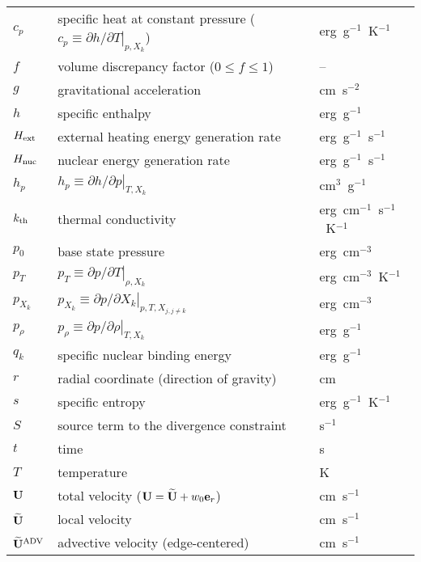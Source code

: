 \begin{center}
\begin{longtable}{|l|p{4.0in}|l|}
$c_p$   & specific heat at constant pressure
          ($c_p \equiv \left . \partial h / \partial T \right |_{p,X_k}$)
        & erg~g$^{-1}$~K$^{-1}$ \\
$f$     & volume discrepancy factor ($0 \le f \le 1$) & -- \\
$g$     & gravitational acceleration                 & cm~s$^{-2}$ \\
$h$     & specific enthalpy                          & erg~g$^{-1}$ \\
${H_{\rm ext}}$ & external heating energy generation rate    & erg~g$^{-1}$~s$^{-1}$ \\
${H_{\rm nuc}}$ & nuclear energy generation rate             & erg~g$^{-1}$~s$^{-1}$ \\
$h_p$   & $h_p \equiv \left . \partial h / \partial p \right |_{T,X_k}$ & cm$^{3}$~g$^{-1}$ \\
$k_{\rm th}$  & thermal conductivity                       & erg~cm$^{-1}$~s$^{-1}$~K$^{-1}$ \\
$p_0$   & base state pressure                        & erg~cm$^{-3}$ \\
$p_T$   & $p_T \equiv \left . \partial p / \partial T \right |_{\rho,X_k}$ & erg~cm$^{-3}$~K$^{-1}$ \\
$p_{X_k}$ & $p_{X_k} \equiv \left . \partial p / \partial X_k \right |_{p,T,X_{j,j\ne k}}$ & erg~cm$^{-3}$ \\
$p_\rho$ & $p_\rho \equiv \left . \partial p / \partial \rho \right |_{T,X_k}$ & erg~g$^{-1}$ \\
$q_k$   & specific nuclear binding energy            & erg~g$^{-1}$  \\
$r$     & radial coordinate (direction of gravity)   & cm \\
$s$     & specific entropy                           & erg~g$^{-1}$~K$^{-1}$ \\
$S$     & source term to the divergence constraint   & s$^{-1}$ \\
$t$     & time                                       & s \\
$T$     & temperature                                & K \\
${\bf U}$     & total velocity (${\bf U} = \widetilde{{\bf U}} + w_0 {\bf e}_r$) & cm~s$^{-1}$ \\
$\widetilde{{\bf U}}$   & local velocity                             & cm~s$^{-1}$ \\
$\widetilde{\mathbf{U}}^{\mathrm{ADV}}$ & advective velocity (edge-centered)         & cm~s$^{-1}$ \\

\end{longtable}
\end{center}

